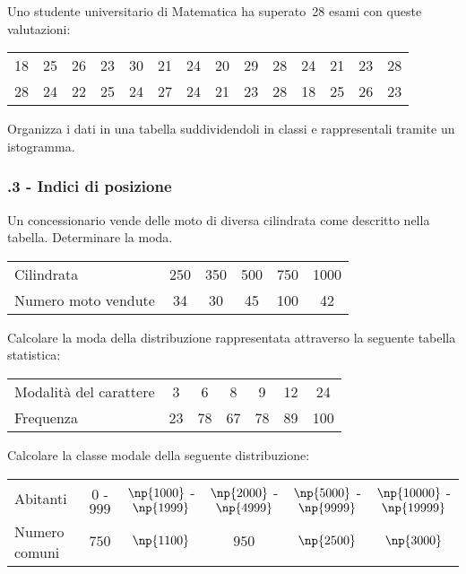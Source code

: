\begin{esercizio}
\label{ese:A.20}
Uno studente universitario di Matematica ha superato~28 esami con queste valutazioni:
\begin{center}
 \begin{tabular}{cccccccccccccc}
18 & 25 & 26 & 23 & 30 & 21 & 24 & 20 & 29 & 28 & 24 & 21 & 23 & 28\\
28 & 24 & 22 & 25 & 24 & 27 & 24 & 21 & 23 & 28 & 18 & 25 & 26 & 23\\
 \end{tabular}
\end{center}
Organizza i dati in una tabella suddividendoli in classi e rappresentali tramite un istogramma.
\end{esercizio}

\subsubsection*{\thechapter.3 - Indici di posizione}

\begin{esercizio}
\label{ese:A.21}
Un concessionario vende delle moto di diversa cilindrata come descritto nella tabella.
Determinare la moda.
\begin{center}
\begin{tabular}{l*{5}{c}}
\toprule
Cilindrata & 250 &350 &500 &750 &1000\\
Numero moto vendute & 34 & 30 & 45 & 100 & 42 \\
\bottomrule
\end{tabular}
\end{center}
\end{esercizio}

\begin{esercizio}
\label{ese:A.22}
Calcolare la moda della distribuzione rappresentata attraverso la seguente tabella statistica:
\begin{center}
 \begin{tabular}{l*{6}{c}}
\toprule
Modalità del carattere & 3 & 6 & 8 & 9 & 12 & 24 \\
Frequenza & 23 & 78 & 67 & 78 & 89 & 100 \\
\bottomrule
\end{tabular}
\end{center}
\end{esercizio}

\begin{esercizio}
\label{ese:A.23}
Calcolare la classe modale della seguente distribuzione:
\begin{center}
\begin{tabular}{l*{5}{c}}
\toprule
Abitanti & 0 - $999$& $\np{1000}$ - $\np{1999}$& $\np{2000}$ - $\np{4999}$ & $\np{5000}$ - $\np{9999}$& $\np{10000}$ - $\np{19999}$ \\
Numero comuni & $750$ & $\np{1100}$ & $950$ & $\np{2500}$ & $\np{3000}$ \\
\bottomrule
\end{tabular}
\end{center}
\end{esercizio}


